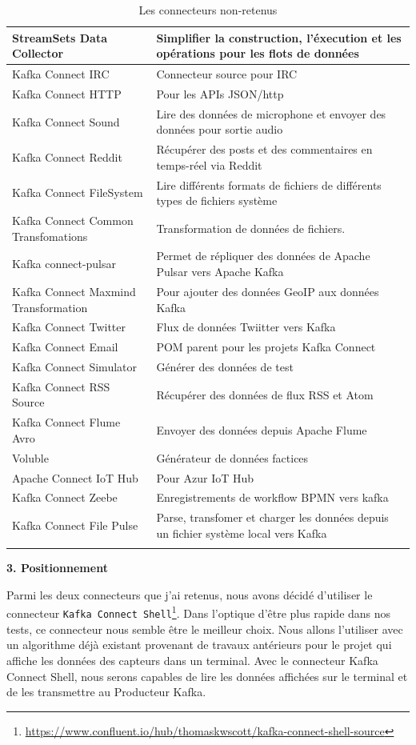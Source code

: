 \documentclass[11pt]{article}
\begin{document}
\begin{longtable}{|p{7.5cm}|p{7.5cm}|}
				StreamSets Data Collector & Simplifier la construction, l’éxecution et les opérations pour les flots de données\\\hline
				Kafka Connect IRC & Connecteur source pour IRC\\\hline
				Kafka Connect HTTP & Pour les APIs JSON/http\\\hline
				Kafka Connect Sound & Lire des données de microphone et envoyer des données pour sortie audio\\\hline
				Kafka Connect Reddit & Récupérer des posts et des commentaires en temps-réel via Reddit\\\hline
				Kafka Connect FileSystem & Lire différents formats de fichiers de différents types de fichiers système\\\hline
				Kafka Connect Common Transfomations & Transformation de données de fichiers.\\\hline
				Kafka connect-pulsar & Permet de répliquer des données de Apache Pulsar vers Apache Kafka\\\hline
				Kafka Connect Maxmind Transformation & Pour ajouter des données GeoIP aux données Kafka\\\hline
				Kafka Connect Twitter & Flux de données Twiitter vers Kafka\\\hline
				Kafka Connect Email & POM parent pour les projets Kafka Connect\\\hline
				Kafka Connect Simulator & Générer des données de test\\\hline
				Kafka Connect RSS Source & Récupérer des données de flux RSS et Atom\\\hline
				Kafka Connect Flume Avro & Envoyer des données depuis Apache Flume\\\hline
				Voluble & Générateur de données factices\\\hline
				Apache Connect IoT Hub & Pour Azur IoT Hub\\\hline
				Kafka Connect Zeebe	& Enregistrements de workflow BPMN vers kafka\\\hline
				Kafka Connect File Pulse & Parse, transfomer et charger les données  depuis un fichier système local vers Kafka\\\hline
				\caption{Les connecteurs non-retenus}
				\label{tab:connecteursnon}
			\end{longtable}\par
			\textbf{3. Positionnement}\par
			Parmi les deux connecteurs que j'ai retenus, nous avons décidé d'utiliser le connecteur \texttt{Kafka Connect Shell}\footnote{\href{https://www.confluent.io/hub/thomaskwscott/kafka-connect-shell-source}{https://www.confluent.io/hub/thomaskwscott/kafka-connect-shell-source}}.
			Dans l'optique d'être plus rapide dans nos tests, ce connecteur nous semble être le meilleur choix.
			Nous allons l'utiliser avec un algorithme déjà existant provenant de travaux antérieurs pour le projet qui affiche les données des capteurs dans un terminal.
			Avec le connecteur Kafka Connect Shell, nous serons capables de lire les données affichées sur le terminal et de les transmettre au Producteur Kafka.
\end{document}
